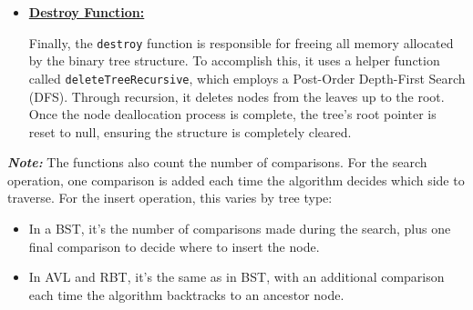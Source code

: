 \begin{itemize}
    \item \underline{\textbf{Destroy Function:}}

    Finally, the \texttt{destroy} function is responsible for freeing all memory allocated by the binary tree structure. To accomplish this, it uses a helper function called \texttt{deleteTreeRecursive}, which employs a Post-Order Depth-First Search (DFS). Through recursion, it deletes nodes from the leaves up to the root. Once the node deallocation process is complete, the tree's root pointer is reset to null, ensuring the structure is completely cleared.

\end{itemize}

\textbf{\textit{Note:}} The functions also count the number of comparisons. For the search operation, one comparison is added each time the algorithm decides which side to traverse. For the insert operation, this varies by tree type:

\begin{itemize}
    \item In a BST, it's the number of comparisons made during the search, plus one final comparison to decide where to insert the node.
    \item In AVL and RBT, it's the same as in BST, with an additional comparison each time the algorithm backtracks to an ancestor node.
\end{itemize}


